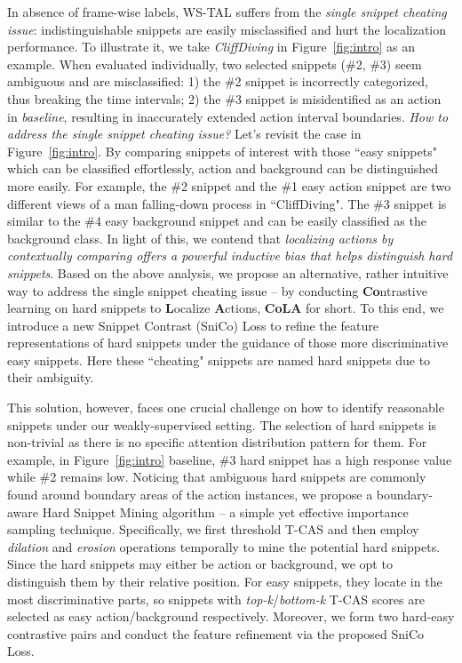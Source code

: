\documentclass[final]{cvpr}
\begin{document}
In absence of frame-wise labels, WS-TAL suffers from the \textit{single snippet cheating issue}: indistinguishable snippets are easily misclassified and hurt the localization performance. To illustrate it, we take \textit{CliffDiving} in Figure~\ref{fig:intro} as an example. When evaluated individually, two selected snippets (\#2, \#3) seem ambiguous and are misclassified: 1) the \#2 snippet is incorrectly categorized, thus breaking the time intervals; 2) the \#3 snippet is misidentified as an action in \textit{baseline}, resulting in inaccurately extended action interval boundaries. \textit{How to address the single snippet cheating issue?} Let's revisit the case in Figure~\ref{fig:intro}. By comparing snippets of interest with those ``easy snippets" which can be classified effortlessly, action and background can be distinguished more easily. For example, the \#2 snippet and the \#1 easy action snippet are two different views of a man falling-down process in ``CliffDiving". The \#3 snippet is similar to the \#4 easy background snippet and can be easily classified as the background class. In light of this, we contend that \textit{localizing actions by contextually comparing offers a powerful inductive bias that helps distinguish hard snippets}. Based on the above analysis, we propose an alternative, rather intuitive way to address the single snippet cheating issue -- by conducting \textbf{Co}ntrastive learning on hard snippets to \textbf{L}ocalize \textbf{A}ctions, \textbf{CoLA} for short. To this end, we introduce a new Snippet Contrast (SniCo) Loss to refine the feature representations of hard snippets under the guidance of those more discriminative easy snippets. Here these ``cheating" snippets are named hard snippets due to their ambiguity. 

This solution, however, faces one crucial challenge on how to identify reasonable snippets under our weakly-supervised setting. The selection of hard snippets is non-trivial as there is no specific attention distribution pattern for them. For example, in Figure~\ref{fig:intro} baseline, \#3 hard snippet has a high response value while \#2 remains low. Noticing that ambiguous hard snippets are commonly found around boundary areas of the action instances, we propose a boundary-aware Hard Snippet Mining algorithm -- a simple yet effective importance sampling technique. Specifically, we first threshold T-CAS and then employ \textit{dilation} and \textit{erosion} operations temporally to mine the potential hard snippets. Since the hard snippets may either be action or background, we opt to distinguish them by their relative position. For easy snippets, they locate in the most discriminative parts, so snippets with \textit{top-k}/\textit{bottom-k} T-CAS scores are selected as easy action/background respectively. Moreover, we form two hard-easy contrastive pairs and conduct the feature refinement via the proposed SniCo Loss.
\end{document}
